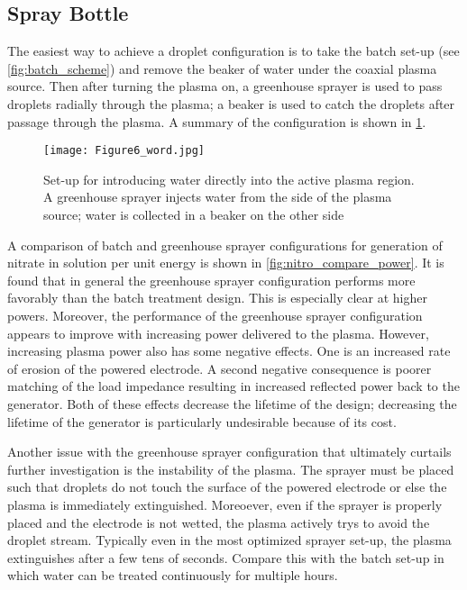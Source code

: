 \subsection{Spray Bottle}
\label{sec:spray_bottle}

The easiest way to achieve a droplet configuration is to take the batch set-up (see \cref{fig:batch_scheme}) and remove the beaker of water under the coaxial plasma source. Then after turning the plasma on, a greenhouse sprayer is used to pass droplets radially through the plasma; a beaker is used to catch the droplets after passage through the plasma. A summary of the configuration is shown in \cref{fig:spray_scheme}.

\begin{figure}[htbp]
  \centering
  \texttt{[image: Figure6\_word.jpg]}
  \caption{Set-up for introducing water directly into the active plasma region.  A greenhouse sprayer injects water from the side of the plasma source; water is collected in a beaker on the other side}
  \label{fig:spray_scheme}
\end{figure}

A comparison of batch and greenhouse sprayer configurations for generation of nitrate in solution per unit energy is shown in \cref{fig:nitro_compare_power}. It is found that in general the greenhouse sprayer configuration performs more favorably than the batch treatment design. This is especially clear at higher powers. Moreover, the performance of the greenhouse sprayer configuration appears to improve with increasing power delivered to the plasma. However, increasing plasma power also has some negative effects. One is an increased rate of erosion of the powered electrode. A second negative consequence is poorer matching of the load impedance resulting in increased reflected power back to the generator. Both of these effects decrease the lifetime of the design; decreasing the lifetime of the generator is particularly undesirable because of its cost.

Another issue with the greenhouse sprayer configuration that ultimately curtails further investigation is the instability of the plasma. The sprayer must be placed such that droplets do not touch the surface of the powered electrode or else the plasma is immediately extinguished. Moreoever, even if the sprayer is properly placed and the electrode is not wetted, the plasma actively trys to avoid the droplet stream. Typically even in the most optimized sprayer set-up, the plasma extinguishes after a few tens of seconds. Compare this with the batch set-up in which water can be treated continuously for multiple hours.

